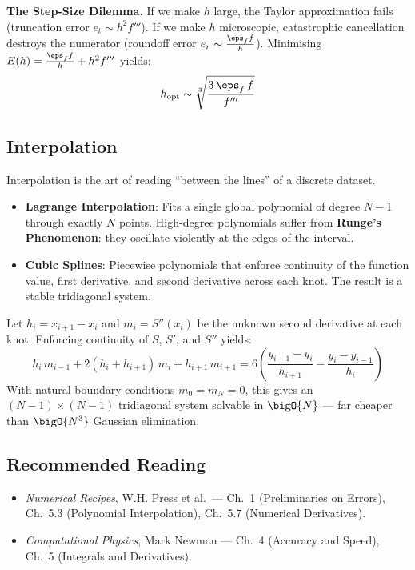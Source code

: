 \textbf{The Step-Size Dilemma.} If we make $h$ large, the Taylor
approximation fails (truncation error $e_t \sim h^2 f'''$). If we make $h$
microscopic, catastrophic cancellation destroys the numerator (roundoff error
$e_r \sim \frac{\eps_f f}{h}$). Minimising $E(h) = \frac{\eps_f f}{h} +
h^2 f'''$ yields:
\begin{equation}
h_{\text{opt}} \sim \sqrt[3]{\frac{3\,\eps_f\, f}{f'''}}
\end{equation}

\subsection{Interpolation}
Interpolation is the art of reading ``between the lines'' of a discrete
dataset.
\begin{itemize}
    \item \textbf{Lagrange Interpolation}: Fits a single global polynomial of
    degree $N-1$ through exactly $N$ points. High-degree polynomials suffer
    from \textbf{Runge's Phenomenon}: they oscillate violently at the edges
    of the interval.
    \item \textbf{Cubic Splines}: Piecewise polynomials that enforce
    continuity of the function value, first derivative, and second derivative
    across each knot. The result is a stable tridiagonal system.
\end{itemize}

\begin{tcolorbox}[colback=green!5!white,colframe=green!50!black,
  title=The Tridiagonal System for Cubic Splines]
Let $h_i = x_{i+1} - x_i$ and $m_i = S''(x_i)$ be the unknown second
derivative at each knot. Enforcing continuity of $S$, $S'$, and $S''$ yields:
\begin{equation}
h_i\, m_{i-1} + 2(h_i + h_{i+1})\, m_i + h_{i+1}\, m_{i+1} =
6\left(\frac{y_{i+1}-y_i}{h_{i+1}} - \frac{y_i - y_{i-1}}{h_i}\right)
\end{equation}
With natural boundary conditions $m_0 = m_N = 0$, this gives an
$(N-1)\times(N-1)$ tridiagonal system solvable in $\bigO{N}$ — far cheaper
than $\bigO{N^3}$ Gaussian elimination.
\end{tcolorbox}

\subsection*{Recommended Reading}
\begin{itemize}
    \item \textit{Numerical Recipes}, W.H. Press et al.\ --- Ch.\ 1
    (Preliminaries on Errors), Ch.\ 5.3 (Polynomial Interpolation),
    Ch.\ 5.7 (Numerical Derivatives).
    \item \textit{Computational Physics}, Mark Newman --- Ch.\ 4 (Accuracy
    and Speed), Ch.\ 5 (Integrals and Derivatives).
\end{itemize}

